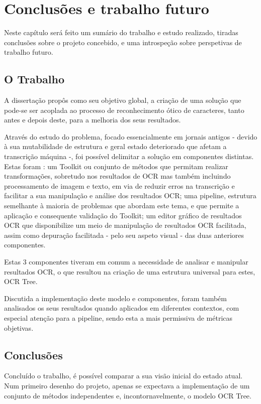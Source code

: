 \chapter{Conclusões e trabalho futuro}
\label{cap_conclusao}

Neste capítulo será feito um sumário do trabalho e estudo realizado, tiradas conclusões sobre o projeto concebido, e uma introspeção sobre perspetivas de trabalho futuro.

\section{O Trabalho}

A dissertação propôs como seu objetivo global, a criação de uma solução que pode-se ser acoplada ao processo de reconhecimento ótico de caracteres, tanto antes e depois deste, para a melhoria dos seus resultados. 

Através do estudo do problema, focado essencialmente em jornais antigos - devido à sua mutabilidade de estrutura e geral estado deteriorado que afetam a transcrição máquina -, foi possível delimitar a solução em componentes distintas. Estas foram : um Toolkit ou conjunto de métodos que permitam realizar transformações, sobretudo nos resultados de OCR mas também incluindo processamento de imagem e texto, em via de reduzir erros na transcrição e facilitar a sua manipulação e análise dos resultados OCR; uma pipeline, estrutura semelhante à maioria de problemas que abordam este tema, e que permite a aplicação e consequente validação do Toolkit; um editor gráfico de resultados OCR que disponibilize um meio de manipulação de resultados OCR facilitada, assim como depuração facilitada - pelo seu aspeto visual - das duas anteriores componentes.

Estas 3 componentes tiveram em comum a necessidade de analisar e manipular resultados OCR, o que resultou na criação de uma estrutura universal para estes, OCR Tree.

Discutida a implementação deste modelo e componentes, foram também analisados os seus resultados quando aplicados em diferentes contextos, com especial atenção para a pipeline, sendo esta a mais permissiva de métricas objetivas.

\section{Conclusões}

Concluído o trabalho, é possível comparar a sua visão inicial do estado atual. Num primeiro desenho do projeto, apenas se expectava a implementação de um conjunto de métodos independentes e, incontornavelmente, o modelo OCR Tree.

